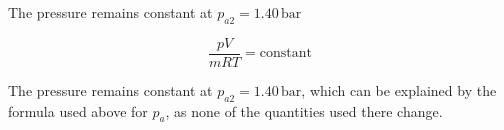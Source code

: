 The pressure remains constant at \( p_{a2} = 1.40 \, \text{bar} \)

\[
\frac{pV}{mRT} = \text{constant}
\]

The pressure remains constant at \( p_{a2} = 1.40 \, \text{bar} \), which can be explained by the formula used above for \( p_a \), as none of the quantities used there change.